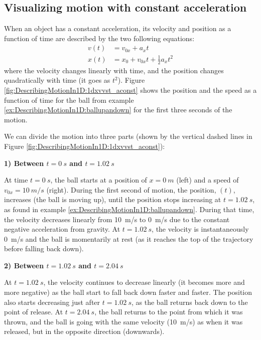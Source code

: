 \subsection{Visualizing motion with constant acceleration}

When an object has a constant acceleration, its velocity and position as a function of time are described by the two following equations:
\begin{align*}
v(t) &= v_{0x} + a_xt\\
x(t) &= x_0+v_{0x}t+ \frac{1}{2}a_xt^2
\end{align*}
where the velocity changes linearly with time, and the position changes quadratically with time (it goes as $t^2$). Figure \ref{fig:DescribingMotionIn1D:1dxvvst_aconst} shows the position and the speed as a function of time for the ball from example \ref{ex:DescribingMotionIn1D:ballupandown} for the first three seconds of the motion.


We can divide the motion into three parts (shown by the vertical dashed lines in Figure \ref{fig:DescribingMotionIn1D:1dxvvst_aconst}):

\textbf{1) Between $t=\SI{0}{s}$ and $t=\SI{1.02}{s}$}

At time $t=\SI{0}{s}$, the ball starts at a position of $x=\SI{0}{m}$ (left) and a speed of $v_{0x}=\SI{10}{m/s}$ (right). During the first second of motion, the position, $(t)$, increases (the ball is moving up), until the position stops increasing at $t=\SI{1.02}{s}$, as found in example \ref{ex:DescribingMotionIn1D:ballupandown}. During that time, the velocity decreases linearly from \SI{10}{m/s} to \SI{0}{m/s} due to the constant negative acceleration from gravity. At $t=\SI{1,02}{s}$, the velocity is instantaneously \SI{0}{m/s} and the ball is momentarily at rest (as it reaches the top of the trajectory before falling back down).

\textbf{2) Between $t=\SI{1.02}{s}$ and $t=\SI{2.04}{s}$}

At $t=\SI{1.02}{s}$, the velocity continues to decrease linearly (it becomes more and more negative) as the ball start to fall back down faster and faster. The position also starts decreasing just after $t=\SI{1,02}{s}$, as the ball returns back down to the point of release. At $t=\SI{2.04}{s}$, the ball returns to the point from which it was thrown, and the ball is going with the same velocity (\SI{10}{m/s}) as when it was released, but in the opposite direction (downwards).

